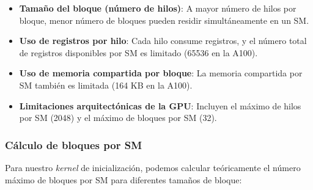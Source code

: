         \begin{itemize}
        
            \item \textbf{Tamaño del bloque (número de hilos)}: A mayor número de hilos por bloque, menor número de bloques pueden residir simultáneamente en un SM.
            
            \item \textbf{Uso de registros por hilo}: Cada hilo consume registros, y el número total de registros disponibles por SM es limitado (65536 en la A100).
            
            \item \textbf{Uso de memoria compartida por bloque}: La memoria compartida por SM también es limitada (164 KB en la A100).
            
            \item \textbf{Limitaciones arquitectónicas de la GPU}: Incluyen el máximo de hilos por SM (2048) y el máximo de bloques por SM (32).
            
        \end{itemize}
        
        \subsubsection{Cálculo de bloques por SM}

            Para nuestro \textit{kernel} de inicialización, podemos calcular teóricamente el número máximo de bloques por SM para diferentes tamaños de bloque:
            
